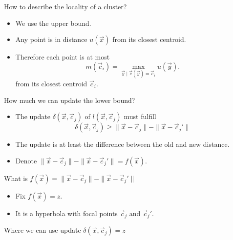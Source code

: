 \documentclass[10pt, compress]{beamer}
\newcommand{\x}{\vec{x}}
\newcommand{\cj}{\vec{c}_j}
\newcommand{\ci}{\vec{c}_i}
\newcommand{\ux}{u(\x)}
\newcommand{\lxcj}{l(\x, \cj)}
\newcommand{\distxcj}{\| \x - \cj \|}
\newcommand{\distxcjp}{\| \x - \cj' \|}
\newcommand{\deltaxcj}{\delta(\x, \cj)}
\newcommand{\mci}{m(\ci)}
\begin{document}
\begin{frame}{How to describe the locality of a cluster?}
  \vspace*{-0.5cm}
  \begin{itemize}
    \item We use the upper bound.
    \item Any point is in distance $\ux$ from its closest centroid.
    \item Therefore each point is at most
      \begin{equation*}
         \mci = \max_{\vec{y} \mid \vec{c}(\vec{y}) = \ci} u(\vec{y}).
      \end{equation*}
      from its closest centroid $\ci$.
  \end{itemize}
  \begin{center}
    
  \end{center}
\end{frame}

\begin{frame}{How much we can update the lower bound?}
  \begin{itemize}
     \item The update $\deltaxcj$ of $\lxcj$ must fulfill
       \begin{equation*}
         \deltaxcj \geq \distxcj - \distxcjp
       \end{equation*}
     \item The update is at least the difference between the old and new distance.
     \item Denote $\distxcj - \distxcjp = f(\x)$.
  \end{itemize}
\end{frame}

\begin{frame}{What is $f(\x) = \distxcj - \distxcjp$}
  \begin{itemize}
    \item Fix $f(\x) = z$.
    \item It is a hyperbola with focal points $\cj$ and $\cj'$.
  \end{itemize}
  \begin{center}
    
  \end{center}
\end{frame}

\begin{frame}{Where we can use update $\deltaxcj = z$}
  \begin{center}
    
  \end{center}
\end{frame}
\end{document}
